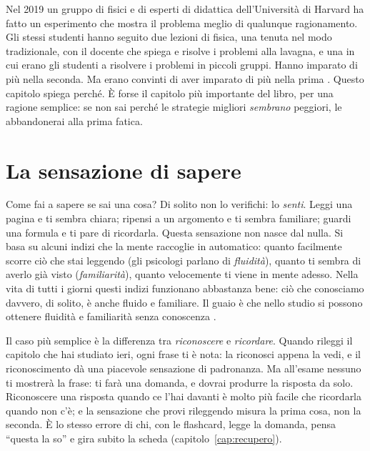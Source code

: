 Nel 2019 un gruppo di fisici e di esperti di didattica dell'Università
di Harvard ha fatto un esperimento che mostra il problema meglio di
qualunque ragionamento. Gli stessi studenti hanno seguito due lezioni
di fisica, una tenuta nel modo tradizionale, con il docente che spiega
e risolve i problemi alla lavagna, e una in cui erano gli studenti a
risolvere i problemi in piccoli gruppi. Hanno imparato di più nella
seconda. Ma erano convinti di aver imparato di più nella prima
\parencite{deslauriers2019}. Questo capitolo spiega perché. È forse il
capitolo più importante del libro, per una ragione semplice: se non sai
perché le strategie migliori \emph{sembrano} peggiori, le abbandonerai
alla prima fatica.

\section{La sensazione di sapere}

Come fai a sapere se sai una cosa? Di solito non lo verifichi: lo
\emph{senti}. Leggi una pagina e ti sembra chiara; ripensi a un
argomento e ti sembra familiare; guardi una formula e ti pare di
ricordarla. Questa sensazione non nasce dal nulla. Si basa su alcuni
indizi che la mente raccoglie in automatico: quanto facilmente scorre
ciò che stai leggendo (gli psicologi parlano di \emph{fluidità}), quanto
ti sembra di averlo già visto (\emph{familiarità}), quanto velocemente
ti viene in mente adesso. Nella vita di tutti i giorni questi indizi
funzionano abbastanza bene: ciò che conosciamo davvero, di solito, è
anche fluido e familiare. Il guaio è che nello studio si possono
ottenere fluidità e familiarità senza conoscenza \parencite{bjork2013}.

Il caso più semplice è la differenza tra \emph{riconoscere} e
\emph{ricordare}. Quando rileggi il capitolo che hai studiato ieri, ogni
frase ti è nota: la riconosci appena la vedi, e il riconoscimento dà
una piacevole sensazione di padronanza. Ma all'esame nessuno ti
mostrerà la frase: ti farà una domanda, e dovrai produrre la risposta
da solo. Riconoscere una risposta quando ce l'hai davanti è molto più
facile che ricordarla quando non c'è; e la sensazione che provi
rileggendo misura la prima cosa, non la seconda. È lo stesso errore di
chi, con le flashcard, legge la domanda, pensa \enquote{questa la so} e
gira subito la scheda (capitolo~\ref{cap:recupero}).

